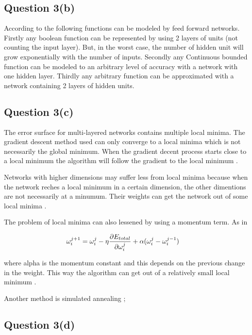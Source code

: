 \documentclass[10pt,a4paper]{article}
\begin{document}
\subsection{Question 3(b)}

According to \cite{Michell2009} the following functions can be modeled by feed forward networks. Firstly any boolean function can be represented by using 2 layers of units (not counting the input layer). But, in the worst case, the number of hidden unit will grow exponentially with the number of inputs. Secondly any Continuous bounded function can be modeled to an arbitrary level of accuracy with a network with one hidden layer. Thirdly any arbitrary function can be approximated with a network containing 2 layers of hidden units.
 
\subsection{Question 3(c)}

The error surface for multi-layered networks contains multiple local minima. The gradient descent method used can only converge to a local minima which is not necessarily the global minimum. When the gradient decent process starts close to a local minimum the algorithm will follow the gradient to the local minimum  \citep{Michell2009}.

Networks with higher dimensions may suffer less from local minima because when the network reches a local minimum in a certain dimension, the other dimentions are not necessarily at a minumum. Their weights can get the network out of some local minima  \citep{Michell2009}.
 
The problem of local minima can also lessened by using a momentum term. As in

\begin{equation}
\begin{split}
\omega_i^{j+1} &= \omega_i^j - \eta\pdv{E_{total}}{\omega_i^j} +\alpha (\omega_i^{j}-\omega_i^{j-1})
\end{split}
\end{equation}

where alpha is the momentum constant and this depends on the previous change in the weight. This way the algorithm can get out of a relatively small local minimum \citep{Michell2009}.

Another method is simulated annealing \citep{rojas};
\subsection{Question 3(d)}
\end{document}
